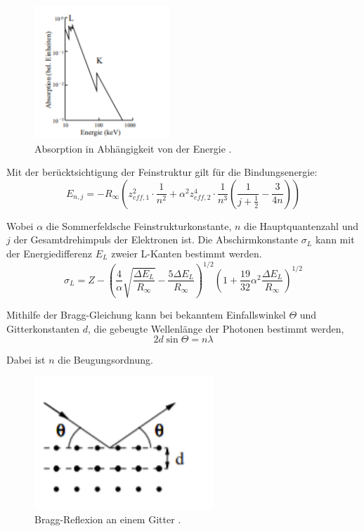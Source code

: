 \begin{figure}[H]
  \centering
  \includegraphics[height=5cm]{kante.PNG}
  \caption{Absorption in Abhängigkeit von der Energie \cite{sample}.}
  \label{fig:kathode}
\end{figure}

Mit der berücktsichtigung der Feinstruktur gilt für die Bindungsenergie:
\begin{equation}
E_{n,j} = -R_{\infty} \left( z_{eff,1}^2 \cdot \frac{1}{n^2} + \alpha^2 z_{eff,2}^4 \cdot \frac{1}{n^3}
\left(\frac{1}{j+ \frac{1}{2}} - \frac{3}{4n} \right) \right)
\end{equation}

Wobei $\alpha$ die Sommerfeldsche Feinstrukturkonstante, $n$ die Hauptquantenzahl und $j$ der Gesamtdrehimpuls der
Elektronen ist.
Die Abschirmkonstante $\sigma_L$ kann mit der Energiedifferenz $E_L$ zweier L-Kanten bestimmt werden.
\begin{equation}
  \sigma_L = Z -\left(\frac{4}{\alpha} \sqrt{\frac{\Delta E_L}{R_{\infty}}} - \frac{5 \Delta E_L}{R_{\infty}} \right)^{1/2}
  \left(1 + \frac{19}{32} \alpha^2  \frac{\Delta E_L}{R_{\infty}} \right)^{1/2}
\end{equation}


Mithilfe der Bragg-Gleichung kann bei bekanntem Einfallswinkel $\Theta$ und Gitterkonstanten $d$, die gebeugte Wellenlänge
der Photonen bestimmt werden,
\begin{equation}
  2d \sin{\Theta} = n \lambda
\end{equation}

Dabei ist $n$ die Beugungsordnung.

\begin{figure}[H]
  \centering
  \includegraphics[height=5cm]{bragg.PNG}
  \caption{Bragg-Reflexion an einem Gitter \cite{sample}.}
  \label{fig:kathode}
\end{figure}
